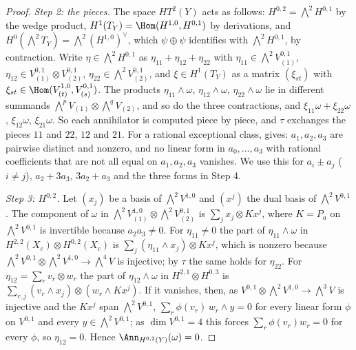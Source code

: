 \begin{proof}
\emph{Step 2: the pieces.} The space $HT^{2}(Y)$ acts as follows:
$H^{0,2}={\textstyle\bigwedge^{2}}H^{0,1}$ by the wedge product,
$H^{1}(T_{Y})=\Hom(H^{1,0},H^{0,1})$ by derivations, and
$H^{0}({\textstyle\bigwedge^{2}}T_{Y})={\textstyle\bigwedge^{2}}(H^{1,0})^{\vee}$,
which $\psi\oplus\psi$ identifies with ${\textstyle\bigwedge^{2}}H^{0,1}$, by
contraction. Write $\eta\in{\textstyle\bigwedge^{2}}H^{0,1}$ as
$\eta_{11}+\eta_{12}+\eta_{22}$ with $\eta_{11}\in{\textstyle\bigwedge^{2}}
V^{0,1}_{(1)}$, $\eta_{12}\in V^{0,1}_{(1)}\otimes V^{0,1}_{(2)}$,
$\eta_{22}\in{\textstyle\bigwedge^{2}}V^{0,1}_{(2)}$, and $\xi\in H^{1}(T_{Y})$
as a matrix $(\xi_{st})$ with $\xi_{st}\in\Hom(V^{1,0}_{(t)},V^{0,1}_{(s)})$.
The products $\eta_{11}\wedge\omega$, $\eta_{12}\wedge\omega$,
$\eta_{22}\wedge\omega$ lie in different summands
${\textstyle\bigwedge^{p}}V_{(1)}\otimes{\textstyle\bigwedge^{q}}V_{(2)}$, and so
do the three contractions, and $\xi_{11}\omega+\xi_{22}\omega$, $\xi_{12}\omega$,
$\xi_{21}\omega$. So each annihilator is computed piece by piece, and $\tau$
exchanges the pieces $11$ and $22$, $12$ and $21$. For a rational exceptional
class,  gives: $a_{1},a_{2},a_{3}$ are pairwise distinct
and nonzero, and no linear form in $a_{0},\dots,a_{3}$ with rational
coefficients that are not all equal on $a_{1},a_{2},a_{3}$ vanishes. We use
this for $a_{i}\pm a_{j}$ ($i\ne j$), $a_{2}+3a_{3}$, $3a_{2}+a_{3}$ and the
three forms in Step 4.

\emph{Step 3: $H^{0,2}$.} Let $(x_{j})$ be a basis of
${\textstyle\bigwedge^{2}}V^{1,0}$ and $(x^{j})$ the dual basis of
${\textstyle\bigwedge^{2}}V^{0,1}$. The component of $\omega$ in
${\textstyle\bigwedge^{2}}V^{1,0}_{(1)}\otimes{\textstyle\bigwedge^{2}}
V^{0,1}_{(2)}$ is $\sum_{j}x_{j}\otimes Kx^{j}$, where $K=P_{a}$ on
${\textstyle\bigwedge^{2}}V^{0,1}$ is invertible because $a_{2}a_{3}\ne0$. For
$\eta_{11}\ne0$ the part of $\eta_{11}\wedge\omega$ in
$H^{2,2}(X_{c})\otimes H^{0,2}(X_{c})$ is $\sum_{j}(\eta_{11}\wedge x_{j})
\otimes Kx^{j}$, which is nonzero because ${\textstyle\bigwedge^{2}}V^{0,1}
\otimes{\textstyle\bigwedge^{2}}V^{1,0}\to{\textstyle\bigwedge^{4}}V$ is
injective; by $\tau$ the same holds for $\eta_{22}$. For
$\eta_{12}=\sum_{r}v_{r}\otimes w_{r}$ the part of $\eta_{12}\wedge\omega$ in
$H^{2,1}\otimes H^{0,3}$ is $\sum_{r,j}(v_{r}\wedge x_{j})\otimes
(w_{r}\wedge Kx^{j})$. If it vanishes, then, as $V^{0,1}\otimes
{\textstyle\bigwedge^{2}}V^{1,0}\to{\textstyle\bigwedge^{3}}V$ is injective and
the $Kx^{j}$ span ${\textstyle\bigwedge^{2}}V^{0,1}$,
$\sum_{r}\phi(v_{r})\,w_{r}\wedge y=0$ for every linear form $\phi$ on
$V^{0,1}$ and every $y\in{\textstyle\bigwedge^{2}}V^{0,1}$; as
$\dim V^{0,1}=4$ this forces $\sum_{r}\phi(v_{r})w_{r}=0$ for every $\phi$,
so $\eta_{12}=0$. Hence $\Ann_{H^{0,2}(Y)}(\omega)=0$.


\end{proof}
